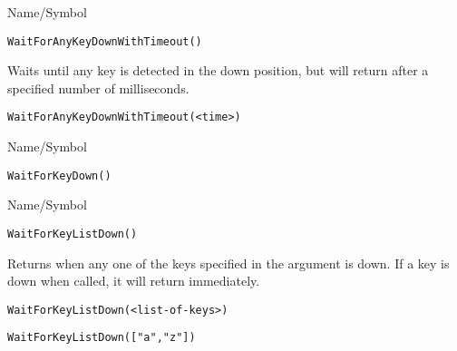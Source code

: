 \rl


\begin{desc}{Name/Symbol}
\item[Name/Symbol]  	\verb+WaitForAnyKeyDownWithTimeout()+

\item[Description] Waits until any key is detected in the down position, but will return
  after a specified number of milliseconds.

\item[Usage]
\begin{verbatim}
WaitForAnyKeyDownWithTimeout(<time>)
\end{verbatim}

\item[Example]	

\item[See Also]	
\end{desc}

\rl


\begin{desc}{Name/Symbol}
\item[Name/Symbol]  	\verb+WaitForKeyDown()+

\item[Description]	

\item[Usage]		

\item[Example]	

\item[See Also]	
\end{desc}

\rl


\begin{desc}{Name/Symbol}
\item[Name/Symbol]  	\verb+WaitForKeyListDown()+

\item[Description] Returns when any one of the keys specified in the
  argument is down. If a key is down when called, it will return immediately.

\item[Usage]
\begin{verbatim}
WaitForKeyListDown(<list-of-keys>)
\end{verbatim}

\item[Example]     	
\begin{verbatim}
WaitForKeyListDown(["a","z"])
\end{verbatim}

\item[See Also]	
 \end{desc}

